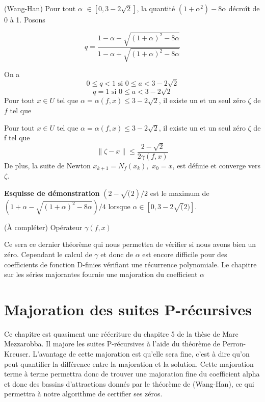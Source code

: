 \documentclass[a4paper,10.5pt]{article}
\begin{document}
	
	\begin{theorem} (Wang-Han)
		Pour tout $\alpha$ $\in [0,3-2\sqrt{2}]$, la quantité $(1+\alpha^{2})-8\alpha$ décroît de 0 à 1. Posons
		
		\[q=\frac{1-\alpha-\sqrt{(1+\alpha)^{2}-8\alpha}}{1-\alpha+\sqrt{(1+\alpha)^{2}-8\alpha}}\]
		
		On a
		\[0 \leq q<1 \text{ si } 0 \leq a < 3-2\sqrt{2}\]
		\[q=1        \text{ si } 0 \leq a < 3-2\sqrt{2}\]
		Pour tout $x\in U$ tel que $\alpha=\alpha(f,x) \leq 3-2\sqrt{2}$, il existe un et un seul zéro $\zeta$ de $f$ tel que\\
	\end{theorem}
	
	
	\begin{corollaire}
		Pour tout $x\in U$ tel que $\alpha=\alpha(f,x) \leq 3-2\sqrt{2}$, il existe un et un seul zéro $\zeta$ de f tel que
		\[\left\|\zeta-x\right\|\leq\frac{2-\sqrt{2}}{2\gamma(f,x)}\]
		De plus, la suite de Newton $x_{k+1}=N_{f}(x_{k}),$ $x_{0}=x$, est définie et converge vers $\zeta$.
	\end{corollaire}
	\noindent \textbf{Esquisse de démonstration} $(2-\sqrt(2)/2$ est le maximum de $(1+\alpha-\sqrt{(1+\alpha)^{2}-8\alpha})/4$ lorsque $\alpha \in [0,3-2\sqrt(2)]$.
	
	(À compléter)
	\noindent Opérateur $\gamma(f,x)$
	
	Ce sera ce dernier théorème qui nous permettra de vérifier si nous avons bien un zéro. Cependant le calcul de $\gamma$ et donc de $\alpha$ est encore difficile pour des coefficients de fonction D-finies vérifiant une récurrence polynomiale. Le chapitre sur les séries majorantes fournie une majoration du coefficient $\alpha$
	
	
	
	
	\section{Majoration des suites P-récursives}
	
	Ce chapitre est quasiment une réécriture du chapitre 5 de la thèse de Marc Mezzarobba. Il majore les suites P-récursives à l'aide du théorème de Perron-Kreuser.
	L'avantage de cette majoration est qu'elle sera fine, c'est à dire qu'on peut quantifier la différence entre la majoration et la solution.
	Cette majoration terme à terme permettra donc de trouver une majoration fine du coefficient alpha et donc des bassins d'attractions donnés par le théorème de (Wang-Han), ce qui permettra à notre algorithme de certifier ses zéros.
	
\end{document}

